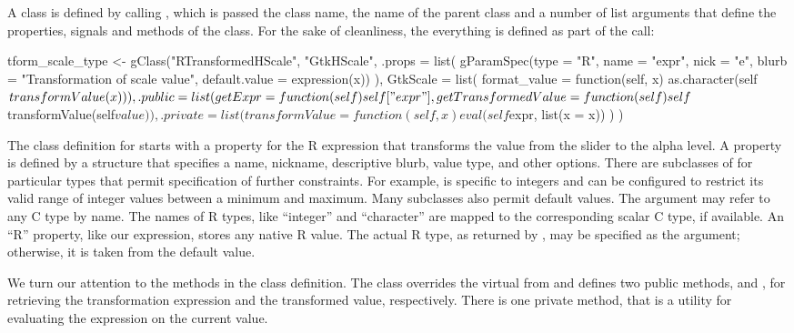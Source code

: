 A class is defined by calling , which is passed the
class name, the name of the parent class and a number of list
arguments that define the properties, signals and methods of the
class. For the sake of cleanliness, the everything is defined as part
of the  call:
\begin{Schunk}
\begin{Sinput}
 tform_scale_type <- 
   gClass("RTransformedHScale", "GtkHScale",
          .props = list(
            gParamSpec(type = "R", name = "expr", nick = "e", 
                       blurb = "Transformation of scale value",                 
                       default.value = expression(x))
            ),
          GtkScale = list(
            format_value = function(self, x) 
              as.character(self$transformValue(x))
            ),
          .public = list(
            getExpr = function(self) self["expr"],
            getTransformedValue = function(self) 
              self$transformValue(self$value)
            ),
          .private = list(
            transformValue = function(self, x) 
              eval(self$expr, list(x = x))
           )
          )
\end{Sinput}
\end{Schunk}

The class definition for  starts with a
property for the R expression that transforms the value from the
slider to the alpha level. A property is defined by a
 structure that specifies a name, nickname,
descriptive blurb, value type, and other options.  There are
subclasses of  for particular types that permit
specification of further constraints. For example,
 is specific to integers and can be configured to
restrict its valid range of integer values between a minimum and
maximum. Many  subclasses also permit default
values. The  argument may refer to any C
type by name. The names of R types, like ``integer'' and ``character''
are mapped to the corresponding scalar C type, if available. An ``R''
property, like our expression, stores any native R value. The actual R
type, as returned by , may be specified as the
 argument; otherwise, it is taken from
the default value.

We turn our attention to the methods in the class definition. The
class overrides the  virtual from
 and defines two public methods,  and
, for retrieving the transformation
expression and the transformed value, respectively. There is one
private method,  that is a utility for evaluating
the expression on the current value.

